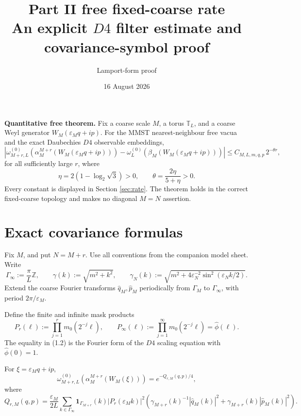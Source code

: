 \documentclass[11pt,a4paper]{article}
\title{Part II free fixed-coarse rate\\[3pt]
\large An explicit \(D4\) filter estimate and covariance-symbol proof}
\author{Lamport-form proof}
\date{16 August 2026}
\newcommand{\eps}{\varepsilon}
\newcommand{\T}{\mathbb T}
\begin{document}
\maketitle

\begin{resultbox}
\textbf{Quantitative free theorem.}  Fix a coarse scale \(M\), a torus
\(\T_L\), and a coarse Weyl generator \(W_M(\eps_Mq+ip)\).  For the MMST
nearest-neighbour free vacua and the exact Daubechies \(D4\) observable
embeddings,
\[
 \left|
 \omega_{M+r,L}^{(0)}\!\left(\alpha_M^{M+r}
      (W_M(\eps_Mq+ip))\right)
 -\omega_L^{(0)}\!\left(\beta_M(W_M(\eps_Mq+ip))\right)
 \right|
 \le C_{M,L,m,q,p}\,2^{-\theta r},                              \tag{R}
\]
for all sufficiently large \(r\), where
\[
 \eta=2(1-\log_2\sqrt3)>0,\qquad
 \theta=\frac{2\eta}{5+\eta}>0.                                \tag{E}
\]
Every constant is displayed in Section \ref{sec:rate}.  The theorem holds in
the correct fixed-coarse topology and makes no diagonal \(M=N\) assertion.
\end{resultbox}

\tableofcontents

\section{Exact covariance formulas}\label{sec:cov}

Fix \(M\), and put \(N=M+r\).  Use all conventions from the companion model
sheet.  Write
\[
 \Gamma_\infty:=\frac{\pi}{L}\mathbb Z,\qquad
 \gamma(k):=\sqrt{m^2+k^2},\qquad
 \gamma_N(k):=\sqrt{m^2+4\eps_N^{-2}\sin^2(\eps_Nk/2)}.          \tag{1.1}
\]
Extend the coarse Fourier transforms \(\widehat q_M,\widehat p_M\) periodically
from \(\Gamma_M\) to \(\Gamma_\infty\), with period \(2\pi/\eps_M\).

Define the finite and infinite mask products
\[
 P_r(\ell):=\prod_{j=1}^r m_0(2^{-j}\ell),\qquad
 P_\infty(\ell):=\prod_{j=1}^\infty m_0(2^{-j}\ell)
 =\widehat\phi(\ell).                                          \tag{1.2}
\]
The equality in (1.2) is the Fourier form of the \(D4\) scaling equation with
\(\widehat\phi(0)=1\).

\begin{lemma}\label{lem:finecov}
For \(\xi=\eps_Mq+ip\),
\[
 \omega_{M+r,L}^{(0)}(\alpha_M^{M+r}(W_M(\xi)))
 =e^{-Q_{r,M}(q,p)/4},                                        \tag{1.3}
\]
where
\[
 Q_{r,M}(q,p)
 =\frac{\eps_M}{2L}\sum_{k\in\Gamma_\infty}
 \mathbf1_{\Gamma_{M+r}}(k)|P_r(\eps_Mk)|^2
 \left(\gamma_{M+r}(k)^{-1}|\widehat q_M(k)|^2
       +\gamma_{M+r}(k)|\widehat p_M(k)|^2\right).             \tag{1.4}
\]
\end{lemma}
\end{document}

